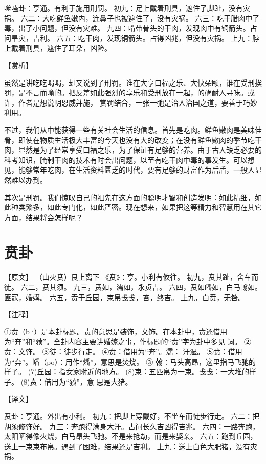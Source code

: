 \documentclass[a4paper,12pt,UTF8,twoside]{ctexbook}
\begin{document}
噬嗑卦：亨通。有利于施用刑罚。
初九：足上戴着刑具，遮住了脚趾，没有灾祸。
六二：大吃鲜鱼嫩内，连鼻子也被遮住了，没有灾祸。
六三：吃干腊肉中了毒，出了小问题，但没有灾难。
九四：啃带骨头的干肉，发现肉中有铜箭头。占问旱灾，吉利。
六五：吃干肉，发现铜箭头。占得凶兆，但没有灾祸。
上九：脖上戴着刑具，遮住了耳朵，凶险。

【赏析】

虽然是讲吃吃喝喝，却又说到了刑罚。谁在大享口福之乐、大快朵颐，谁在受刑挨罚，是不言而喻的。把反差如此强烈的享乐和受刑放在一起，的确耐人寻味。或许，作者是想说明恩威并施， 赏罚结合，一张一弛是治人治国之道，要善于巧妙利用。

不过，我们从中能获得一些有关社会生活的信息。首先是吃肉。鲜鱼嫩肉是美味佳肴，即使在物质生活极大丰富的今天也没有大的改变；在没有鲜鱼嫩肉的季节吃干肉，显然是为了经常享受口福之乐，为了保证有足够的营养。由于古人缺乏必要的科考知识，腌制干肉的技术有时会出问题，以至有吃干肉中毒的事发生。可以想见，能够常年吃肉，在生活资料匮乏的时代，要有足够的财富作为后盾，一般人显然难以办到。

其次是刑罚。我们惊叹自己的祖先在这方面的聪明才智和创造发明：如此精细，如此种类繁多，如此专门化，如此严密。现在想来，如果把这等精力和智慧用在其它方面，结果将会怎样呢？

\chapter{贲卦}

【原文】
（山火贲）艮上离下
《贲》：亨。小利有攸往。
初九，贲其趾，舍车而徒。
六二，贲其须。
九三，贲如，濡如，永贞吉。
六四，贲如皤如，白马翰如。匪寇，婚媾。
六五，贲于丘园，束帛戋戋，吝，终吉。
上九，白贲，无咎。

【注释】

①贲（b i）是本卦标题。责的意思是装饰，文饰。在本卦中，贲还借用为“奔”和“豮”。全卦内容主要讲婚嫁之事，作标题的“贲”字为卦中多见 词。
②贲：文饰。
③徒：徒步行走。
④贲：借用为“奔”。濡： 汗湿。
⑤贲：借用为“奔”。皤（po）：用作“燔”，意思是焚烧。
③ 翰：马头高昂，这里指马飞驰的样子。
(7)丘园：指女家附近的地方。
(8)束：五匹帛为一束。戋戋：一大堆的样子。
(8)贲：借用为“豮”，意 思是大猪。

【译文】

贲卦：亨通。外出有小利。
初九：把脚上穿戴好，不坐车而徒步行走。
六二：把胡须修饰好。
九三：奔跑得满身大汗。占问长久吉凶得吉兆。
六四：一路奔跑，太阳晒得像火烧，白马昂头飞驰。不是来抢劫，而是来娶亲。
六五：跑到丘园，送上一束束布帛。遇到了困难，结果还是吉利。
上九：送上白色大肥猪，没有灾祸。
\end{document}

